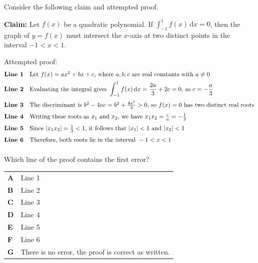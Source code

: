 \documentclass[11pt,a4paper]{article}
\begin{document}
\begin{enumerate}[label=\textbf{\arabic*.},leftmargin=*,itemsep=0pt,start=3]
Consider the following claim and attempted proof.

\begin{center}
\begin{minipage}{0.82\linewidth}
\centering
\textbf{Claim:} Let $f(x)$ be a quadratic polynomial. If $\displaystyle\int_{-1}^{1} f(x)\,\mathrm{d}x = 0$, then the graph of $y = f(x)$ must intersect the $x$-axis at two distinct points in the interval $-1 < x < 1$.
\end{minipage}
\end{center}
Attempted proof:
\[
\begin{array}{@{}rl@{}}
\textbf{Line 1} & \text{Let } f(x) = ax^2 + bx + c\text{, where } a, b, c \text{ are real constants with } a \ne 0 \\[5pt]
\textbf{Line 2} & \text{Evaluating the integral gives } \displaystyle\int_{-1}^{1} f(x)\,\mathrm{d}x = \frac{2a}{3} + 2c = 0\text{, so } c = -\frac{a}{3} \\[12pt]
\textbf{Line 3} & \text{The discriminant is } b^2-4ac=b^2+\frac{4a^2}{3}>0\text{, so }f(x)=0\text{ has two distinct real roots} \\[7pt]
\textbf{Line 4} & \text{Writing these roots as }x_1\text{ and }x_2\text{, we have }x_1x_2=\frac{c}{a}=-\frac{1}{3} \\[7pt]
\textbf{Line 5} & \text{Since } |x_1 x_2| = \frac{1}{3} < 1\text{, it follows that } |x_1| < 1 \text{ and } |x_2| < 1 \\[7pt]
\textbf{Line 6} & \text{Therefore, both roots lie in the interval } -1 < x < 1\\[5pt]
\end{array}
\]

Which line of the proof contains the first error?

\par\vspace*{12pt}
\begin{tabularx}{\linewidth}{@{}>{\bfseries}l Y@{}}
A &
Line 1
\\[0.8em]
B &
Line 2
\\[0.8em]
C &
Line 3
\\[0.8em]
D &
Line 4
\\[0.8em]
E &
Line 5
\\[0.8em]
F &
Line 6
\\[0.8em]
G &
There is no error, the proof is correct as written.
\\
\end{tabularx}
\end{enumerate}
\end{document}
